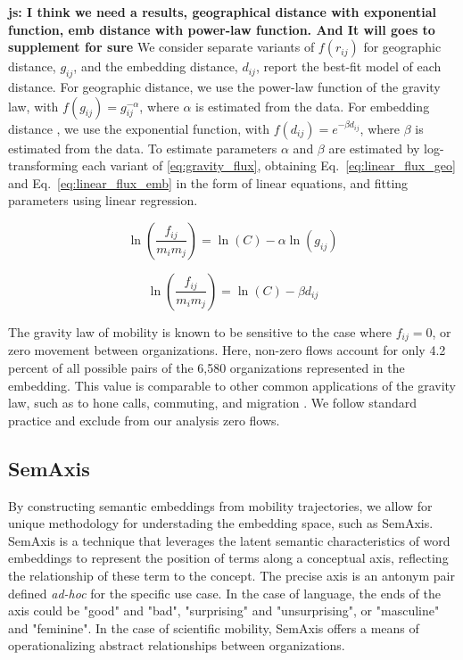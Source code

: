 \documentclass[12pt]{article} %
\def\js#1{ {\color{red}\textbf{js: #1}} }
\begin{document}
\js{I think we need a results, geographical distance with exponential function, emb distance with power-law function. And It will goes to supplement for sure}
We consider separate variants of $f(r_{ij})$ for geographic distance, $g_{ij}$, and the embedding distance, $d_{ij}$, report the best-fit model of each distance.
For geographic distance, we use the power-law function of the gravity law, with $f(g_{ij})= g^{-\alpha}_{ij}$, where $\alpha$ is estimated from the data. 
For embedding distance , we use the exponential function, with $f(d_{ij}) = e^{-\beta d_{ij}}$, where $\beta$ is estimated from the data. 
To estimate parameters $\alpha$ and $\beta$ are estimated by log-transforming each variant of \ref{eq:gravity_flux}, obtaining Eq.~\ref{eq:linear_flux_geo} and Eq.~\ref{eq:linear_flux_emb} in the form of linear equations, and fitting parameters using linear regression. 

\begin{equation}
	\label{eq:linear_flux_geo}
	\ln(\frac{f_{ij}}{m_im_j}) = \ln(C)  - \alpha \ln(g_{ij})
\end{equation}

\begin{equation}
	\label{eq:linear_flux_emb}
	\ln(\frac{f_{ij}}{m_im_j}) = \ln(C) - \beta d_{ij}
\end{equation}

The gravity law of mobility is known to be sensitive to the case where $f_{ij} = 0$, or zero movement between organizations. 
Here, non-zero flows account for only 4.2 percent of all possible pairs of  the 6,580 organizations represented in the embedding.
This value is comparable to other common applications of the gravity law, such as to hone calls, commuting, and migration \cite{simini2012universal}.
We follow standard practice and exclude from our analysis zero flows. 


%
%
\subsection*{SemAxis}
By constructing semantic embeddings from mobility trajectories, we allow for unique methodology for understading the embedding space, such as SemAxis.
SemAxis is a technique that leverages the latent semantic characteristics of word embeddings to represent the position of terms along a conceptual axis, reflecting the relationship of these term to the concept. 
The precise axis is an antonym pair defined \textit{ad-hoc} for the specific use case.
In the case of language, the ends of the axis could be "good" and "bad", "surprising" and "unsurprising", or "masculine" and "feminine". 
In the case of scientific mobility, SemAxis offers a means of operationalizing abstract relationships between organizations.
\end{document}

